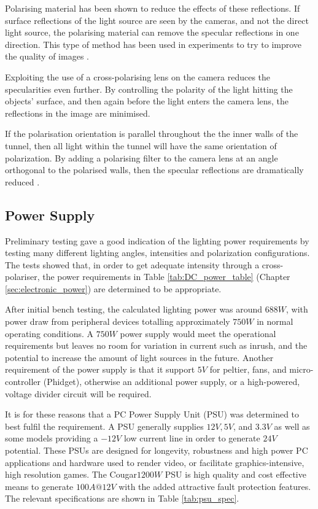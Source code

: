 \documentclass[fleqn,twoside,12pt]{report}
\begin{document}
Polarising material has been shown to reduce the effects of these reflections. If surface reflections of the light source are seen by the cameras, and not the direct light source, the polarising material can remove the specular reflections in one direction. This type of method has been used in experiments to try to improve the quality of images \cite{atkinson, wolff}.

Exploiting the use of a cross-polarising lens on the camera reduces the specularities even further. By controlling the polarity of the light hitting the objects' surface, and then again before the light enters the camera lens, the reflections in the image are minimised.

If the polarisation orientation is parallel throughout the the inner walls of the tunnel, then all light within the tunnel will have the same orientation of polarization. By adding a polarising filter to the camera lens at an angle orthogonal to the polarised walls, then the specular reflections are dramatically reduced \cite{anderson, kuranov}.


\subsection{Power Supply}


Preliminary testing gave a good indication of the lighting power requirements by testing many different lighting angles, intensities and polarization configurations. The tests showed that, in order to get adequate intensity through a cross-polariser, the power requirements in Table \ref{tab:DC_power_table} (Chapter \ref{sec:electronic_power}) are determined to be appropriate.

After initial bench testing, the calculated lighting power was around $688W$, with power draw from peripheral devices totalling approximately $750W$ in normal operating conditions. A $750W$ power supply would meet the operational requirements but leaves no room for variation in current such as inrush, and the potential to increase the amount of light sources in the future. Another requirement of the power supply is that it support $5V$ for peltier, fans, and micro-controller (Phidget), otherwise an additional power supply, or a high-powered, voltage divider circuit will be required.

It is for these reasons that a PC Power Supply Unit (PSU) was determined to best fulfil the requirement. A PSU generally supplies $12V, 5V$, and $3.3V$ as well as some models providing a $-12V$ low current line in order to generate $24V$ potential. These PSUs are designed for longevity, robustness and high power PC applications and hardware used to render video, or facilitate graphics-intensive, high resolution games. The Cougar\textregistered $1200W$ PSU is high quality and cost effective means to generate $100A @ 12V$ with the added attractive fault protection features. The relevant specifications are shown in Table \ref{tab:psu_spec}.
\end{document}

